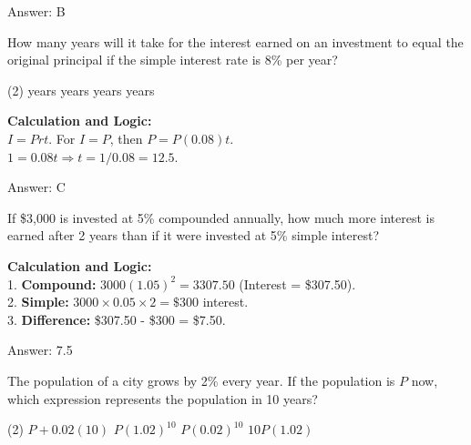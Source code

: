 \documentclass[11pt,paper=a4,answers]{exam}
\begin{document}
\begin{questions}
\begin{solution}
\vspace{30pt}

Answer: \colorbox{yellow!100}{B}
\end{solution}

\vspace{60pt}

\question
How many years will it take for the interest earned on an investment to equal the original principal if the simple interest rate is 8\% per year?
\begin{tasks}(2)
     years
     years
     years
     years
\end{tasks}

\begin{solution}
\textbf{Calculation and Logic:} \\
$I = Prt$. For $I = P$, then $P = P(0.08)t$. \\
$1 = 0.08t \Rightarrow t = 1 / 0.08 = 12.5$.

\vspace{30pt}

Answer: \colorbox{yellow!100}{C}
\end{solution}

\vspace{60pt}

\question
If \$3,000 is invested at 5\% compounded annually, how much more interest is earned after 2 years than if it were invested at 5\% simple interest?

\begin{solution}
\textbf{Calculation and Logic:} \\
1. \textbf{Compound:} $3000(1.05)^2 = 3307.50$ (Interest = \$307.50). \\
2. \textbf{Simple:} $3000 \times 0.05 \times 2 = \$300$ interest. \\
3. \textbf{Difference:} \$307.50 - \$300 = \$7.50.

\vspace{30pt}

Answer: \colorbox{yellow!100}{7.5}
\end{solution}

\vspace{60pt}

\question
The population of a city grows by 2\% every year. If the population is $P$ now, which expression represents the population in 10 years?
\begin{tasks}(2)
    \task $P + 0.02(10)$
    \task $P(1.02)^{10}$
    \task $P(0.02)^{10}$
    \task $10P(1.02)$
\end{tasks}


\end{questions}
\end{document}

